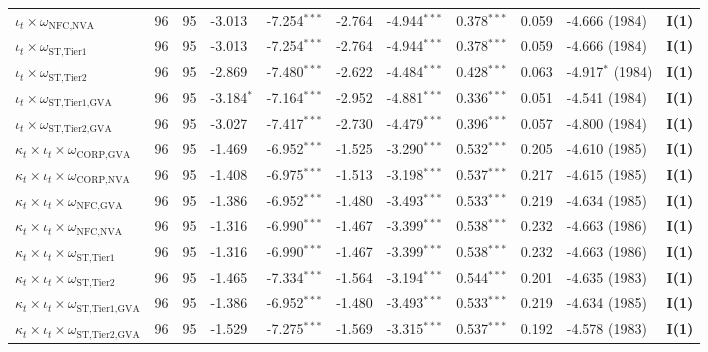 \begin{landscape}
\begin{table}[h!]
\begin{tabular}{p{5.8cm} p{0.6cm} p{0.6cm} p{1.4cm} p{1.4cm} p{1.4cm} p{1.4cm} p{1.4cm} p{1.4cm} p{2.2cm} p{2.2cm}}
$\iota_t \times \omega_{\text{NFC,NVA}}$ & 96 & 95 & -3.013 & -7.254$^{***}$ & -2.764 & -4.944$^{***}$ & 0.378$^{***}$ & 0.059 & -4.666 (1984) & \textbf{I(1)} \\
$\iota_t \times \omega_{\text{ST,Tier1}}$ & 96 & 95 & -3.013 & -7.254$^{***}$ & -2.764 & -4.944$^{***}$ & 0.378$^{***}$ & 0.059 & -4.666 (1984) & \textbf{I(1)} \\
$\iota_t \times \omega_{\text{ST,Tier2}}$ & 96 & 95 & -2.869 & -7.480$^{***}$ & -2.622 & -4.484$^{***}$ & 0.428$^{***}$ & 0.063 & -4.917$^{*}$ (1984) & \textbf{I(1)} \\
$\iota_t \times \omega_{\text{ST,Tier1,GVA}}$ & 96 & 95 & -3.184$^{*}$ & -7.164$^{***}$ & -2.952 & -4.881$^{***}$ & 0.336$^{***}$ & 0.051 & -4.541 (1984) & \textbf{I(1)} \\
$\iota_t \times \omega_{\text{ST,Tier2,GVA}}$ & 96 & 95 & -3.027 & -7.417$^{***}$ & -2.730 & -4.479$^{***}$ & 0.396$^{***}$ & 0.057 & -4.800 (1984) & \textbf{I(1)} \\
$\kappa_t \times \iota_t \times \omega_{\text{CORP,GVA}}$ & 96 & 95 & -1.469 & -6.952$^{***}$ & -1.525 & -3.290$^{***}$ & 0.532$^{***}$ & 0.205 & -4.610 (1985) & \textbf{I(1)} \\
$\kappa_t \times \iota_t \times \omega_{\text{CORP,NVA}}$ & 96 & 95 & -1.408 & -6.975$^{***}$ & -1.513 & -3.198$^{***}$ & 0.537$^{***}$ & 0.217 & -4.615 (1985) & \textbf{I(1)} \\
$\kappa_t \times \iota_t \times \omega_{\text{NFC,GVA}}$ & 96 & 95 & -1.386 & -6.952$^{***}$ & -1.480 & -3.493$^{***}$ & 0.533$^{***}$ & 0.219 & -4.634 (1985) & \textbf{I(1)} \\
$\kappa_t \times \iota_t \times \omega_{\text{NFC,NVA}}$ & 96 & 95 & -1.316 & -6.990$^{***}$ & -1.467 & -3.399$^{***}$ & 0.538$^{***}$ & 0.232 & -4.663 (1986) & \textbf{I(1)} \\
$\kappa_t \times \iota_t \times \omega_{\text{ST,Tier1}}$ & 96 & 95 & -1.316 & -6.990$^{***}$ & -1.467 & -3.399$^{***}$ & 0.538$^{***}$ & 0.232 & -4.663 (1986) & \textbf{I(1)} \\
$\kappa_t \times \iota_t \times \omega_{\text{ST,Tier2}}$ & 96 & 95 & -1.465 & -7.334$^{***}$ & -1.564 & -3.194$^{***}$ & 0.544$^{***}$ & 0.201 & -4.635 (1983) & \textbf{I(1)} \\
$\kappa_t \times \iota_t \times \omega_{\text{ST,Tier1,GVA}}$ & 96 & 95 & -1.386 & -6.952$^{***}$ & -1.480 & -3.493$^{***}$ & 0.533$^{***}$ & 0.219 & -4.634 (1985) & \textbf{I(1)} \\
$\kappa_t \times \iota_t \times \omega_{\text{ST,Tier2,GVA}}$ & 96 & 95 & -1.529 & -7.275$^{***}$ & -1.569 & -3.315$^{***}$ & 0.537$^{***}$ & 0.192 & -4.578 (1983) & \textbf{I(1)} \\

\end{tabular}
\end{table}
\end{landscape}
